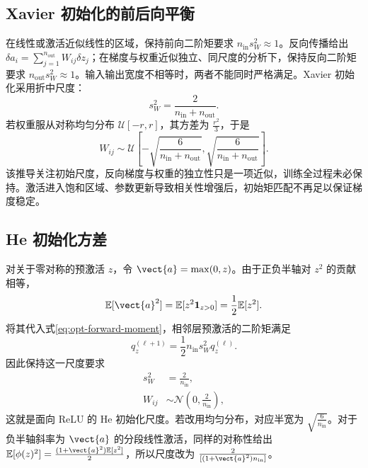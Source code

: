 \documentclass[../textbook.tex]{subfiles}
\begin{document}
\subsection{Xavier 初始化的前后向平衡}
在线性或激活近似线性的区域，保持前向二阶矩要求 $n_{\mathrm{in}}s_W^2\approx1$。反向传播给出
$\delta a_i=\sum_{j=1}^{n_{\mathrm{out}}}W_{ij}\delta z_j$；在梯度与权重近似独立、同尺度的分析下，保持反向二阶矩要求 $n_{\mathrm{out}}s_W^2\approx1$。输入输出宽度不相等时，两者不能同时严格满足。Xavier 初始化采用折中尺度\cite{glorot2010initialization}：
\begin{equation}
 s_W^2=\frac2{n_{\mathrm{in}}+n_{\mathrm{out}}}.
\end{equation}
若权重服从对称均匀分布 $\mathcal U[-r,r]$，其方差为 $\frac{r^2}{3}$，于是
\begin{equation}
 W_{ij}\sim\mathcal U\!\left[-\sqrt{\frac6{n_{\mathrm{in}}+n_{\mathrm{out}}}},
 \sqrt{\frac6{n_{\mathrm{in}}+n_{\mathrm{out}}}}\right].
\end{equation}
该推导关注初始尺度，反向梯度与权重的独立性只是一项近似，训练全过程未必保持。激活进入饱和区域、参数更新导致相关性增强后，初始矩匹配不再足以保证梯度稳定。

\subsection{He 初始化方差}
对关于零对称的预激活 $z$，令 $\vect{a}=\max(0,z)$。由于正负半轴对 $z^2$ 的贡献相等，
\begin{equation}
 \mathbb E[\vect{a}^2]=\mathbb E[z^2\mathbf1_{z>0}]=\frac12\mathbb E[z^2].
\end{equation}
将其代入式\eqref{eq:opt-forward-moment}，相邻层预激活的二阶矩满足
\begin{equation}
 q_z^{(\ell+1)}=\frac12n_{\mathrm{in}}s_W^2q_z^{(\ell)}.
\end{equation}
因此保持这一尺度要求
\begin{equation}
\begin{aligned}
 s_W^2 &= \frac2{n_{\mathrm{in}}}, \\
 W_{ij} &\sim \mathcal N\!\left(0,\frac2{n_{\mathrm{in}}}\right),
\end{aligned}
\end{equation}
这就是面向 ReLU 的 He 初始化尺度\cite{he2015rectifiers}。若改用均匀分布，对应半宽为 $\sqrt{\frac{6}{n_{\mathrm{in}}}}$。对于负半轴斜率为 $\vect{a}$ 的分段线性激活，同样的对称性给出 $\mathbb E[\phi(z)^2]=\frac{(1+\vect{a}^2)\mathbb E[z^2]}{2}$，所以尺度改为 $\frac{2}{[(1+\vect{a}^2)n_{\mathrm{in}}]}$。
\end{document}
